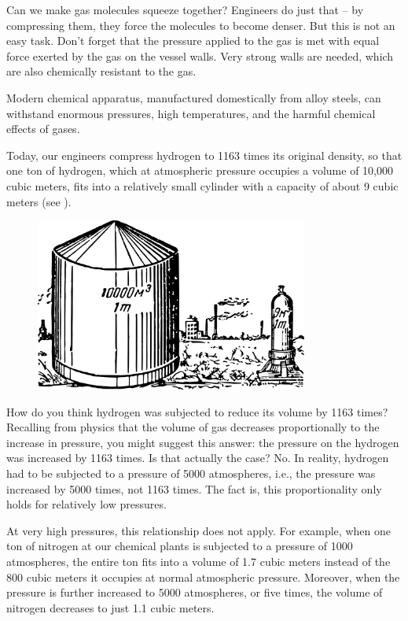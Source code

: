 Can we make gas molecules squeeze together? Engineers do just that -- by compressing them, they force the molecules to become denser. But this is not an easy task. Don't forget that the pressure applied to the gas is met with equal force exerted by the gas on the vessel walls. Very strong walls are needed, which are also chemically resistant to the gas.

Modern chemical apparatus, manufactured domestically from alloy steels, can withstand enormous pressures, high temperatures, and the harmful chemical effects of gases.

Today, our engineers compress hydrogen to 1163 times its original density, so that one ton of hydrogen, which at atmospheric pressure occupies a volume of 10,000 cubic meters, fits into a relatively small cylinder with a capacity of about 9 cubic meters (see ).


\begin{figure}[h!]
\centering
\includegraphics[width=0.8\textwidth]{figures/ch-11/fig-162.pdf}
\end{figure}


How do you think hydrogen was subjected to reduce its volume by 1163 times? Recalling from physics that the volume of gas decreases proportionally to the increase in pressure, you might suggest this answer: the pressure on the hydrogen was increased by 1163 times. Is that actually the case? No. In reality, hydrogen had to be subjected to a pressure of 5000 atmospheres, i.e., the pressure was increased by 5000 times, not 1163 times. The fact is, this proportionality only holds for relatively low pressures.

At very high pressures, this relationship does not apply. For example, when one ton of nitrogen at our chemical plants is subjected to a pressure of 1000 atmospheres, the entire ton fits into a volume of 1.7 cubic meters instead of the 800 cubic meters it occupies at normal atmospheric pressure. Moreover, when the pressure is further increased to 5000 atmospheres, or five times, the volume of nitrogen decreases to just 1.1 cubic meters.



